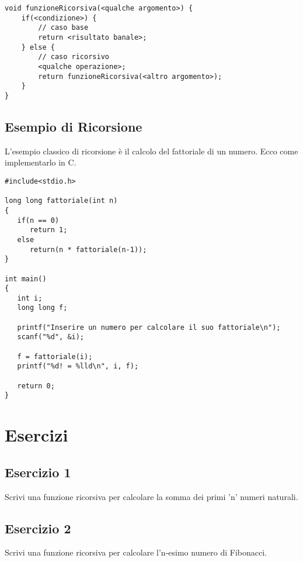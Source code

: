 \begin{lstlisting}[style=codeSnippet]
void funzioneRicorsiva(<qualche argomento>) {
	if(<condizione>) {
		// caso base
		return <risultato banale>;
	} else {
		// caso ricorsivo
		<qualche operazione>;
		return funzioneRicorsiva(<altro argomento>);
	}
}
\end{lstlisting}

\subsection{Esempio di Ricorsione}
L'esempio classico di ricorsione è il calcolo del fattoriale di un numero. Ecco come implementarlo in C.

\begin{verbatim}
#include<stdio.h>

long long fattoriale(int n)
{
   if(n == 0)
	  return 1;
   else
	  return(n * fattoriale(n-1));
}

int main()
{
   int i;
   long long f;

   printf("Inserire un numero per calcolare il suo fattoriale\n");
   scanf("%d", &i);

   f = fattoriale(i);
   printf("%d! = %lld\n", i, f);

   return 0;
}
\end{verbatim}

\section{Esercizi}

\subsection{Esercizio 1}
Scrivi una funzione ricorsiva per calcolare la somma dei primi 'n' numeri naturali.


\subsection{Esercizio 2}
Scrivi una funzione ricorsiva per calcolare l'n-esimo numero di Fibonacci.


